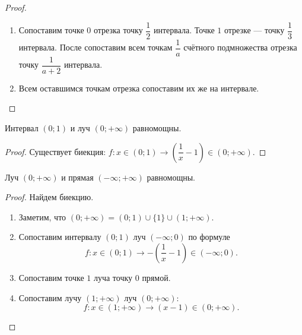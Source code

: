 \documentclass[a4paper]{article}
\theoremstyle{named}
\begin{document}
\begin{colloq}
\begin{proof}
\begin{enumerate}
                \item
                    Сопоставим точке $0$ отрезка точку $\dfrac{1}{2}$ интервала. Точке $1$ отрезке --- точку $\dfrac{1}{3}$ интервала. После сопоставим всем точкам $\dfrac{1}{a}$ счётного подмножества отрезка точку $\dfrac{1}{a + 2}$ интервала.

                \item
                    Всем оставшимся точкам отрезка сопоставим их же на интервале.
            \end{enumerate}
        \end{proof}

        \begin{theorem*}
            Интервал $(0; 1)$ и луч $(0; +\infty)$ равномощны.
        \end{theorem*}

        \begin{proof}
            Существует биекция: $f: x \in (0; 1) \to \left(\dfrac{1}{x} - 1\right) \in (0; +\infty)$.
        \end{proof}

        \begin{theorem*}
            Луч $(0; +\infty)$ и прямая $(-\infty; +\infty)$ равномощны.
        \end{theorem*}

        \begin{proof}
            Найдем биекцию.
            \begin{enumerate}
            \item
                Заметим, что $(0; +\infty) = (0; 1) \cup \{1\} \cup (1; +\infty)$.

            \item
                Сопоставим интервалу $(0; 1)$ луч $(-\infty; 0)$ по формуле
                \begin{equation*}
                    f: x \in (0; 1) \to -\left(\dfrac{1}{x} - 1\right) \in (-\infty; 0).
                \end{equation*}

            \item
                Сопоставим точке $1$ луча точку $0$ прямой.

            \item
                Сопоставим лучу $(1; +\infty)$ луч $(0; +\infty)$:
                \begin{equation*}
                    f: x \in (1; +\infty) \to (x - 1) \in (0; +\infty).
                \end{equation*}
            \end{enumerate}
        \end{proof}


\end{colloq}
\end{document}
